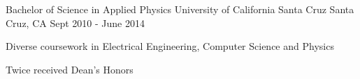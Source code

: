 \begin{cventries}
  \cventry
    {Bachelor of Science in Applied Physics}
    {University of California Santa Cruz}
    {Santa Cruz, CA}
    {Sept 2010 - June 2014}
    {
      \begin{cvitems}
        \item {Diverse coursework in Electrical Engineering, Computer Science and Physics}
        \item{Twice received Dean's Honors}
      \end{cvitems}
    }
\end{cventries}
